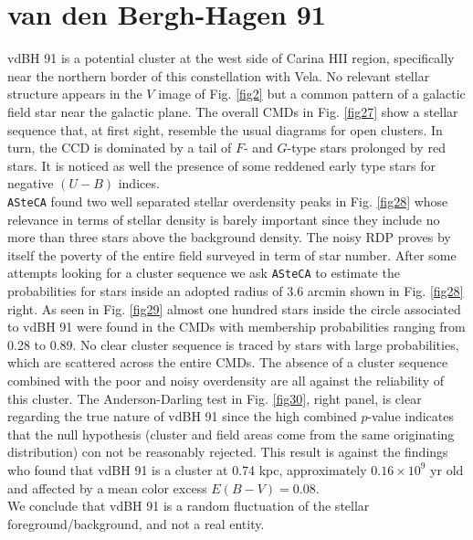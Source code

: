 \documentclass[draft]{aa}
\begin{document}
\section{van den Bergh-Hagen 91}

vdBH 91 is a potential cluster at the west side of Carina HII
region, specifically near the northern border of this constellation with Vela.
No relevant stellar structure appears in the $V$ image of Fig. \ref{fig2} but a
common pattern of a galactic field star near the galactic plane. The overall
CMDs in Fig. \ref{fig27} show a stellar sequence that, at first sight, resemble
the usual diagrams for open clusters. In turn, the CCD
is dominated by a tail of $F$- and $G$-type stars prolonged by red stars. It is
noticed as well the presence of some reddened early type stars for negative
$(U-B)$ indices.\\

\texttt{ASteCA} found two well separated stellar overdensity peaks in Fig.
\ref{fig28} whose relevance in terms of stellar density is barely important
since they include no more than three stars above the background density. The
noisy RDP proves by itself the poverty of the entire field surveyed in term of
star number. After some attempts looking for a cluster sequence we ask
\texttt{ASteCA} to estimate the probabilities for stars inside an adopted radius
of 3.6 arcmin shown in Fig. \ref{fig28} right. As seen in Fig. \ref{fig29}
almost one hundred stars inside the circle associated to vdBH 91 were
found in the CMDs with membership probabilities ranging from 0.28 to 0.89.
No clear cluster sequence is traced by stars with large probabilities, which
are scattered across the entire CMDs. The absence of a cluster sequence
combined with the poor and noisy overdensity are all against the reliability of
this cluster.
%
The Anderson-Darling test in Fig. \ref{fig30}, right panel, is clear regarding
the true nature of vdBH 91 since the high combined $p$-value
indicates that the null hypothesis (cluster and field areas come from the same
originating distribution) con not be reasonably rejected. This result is against
the \cite{Kharchenko_2005} findings who found that vdBH 91 is a cluster at
0.74 kpc, approximately $0.16\times10^9$ yr old and affected by a mean color
excess $E(B-V)=0.08$.\\

We conclude that vdBH 91 is a random fluctuation of the stellar
foreground/background, and not a real entity.
\end{document}
